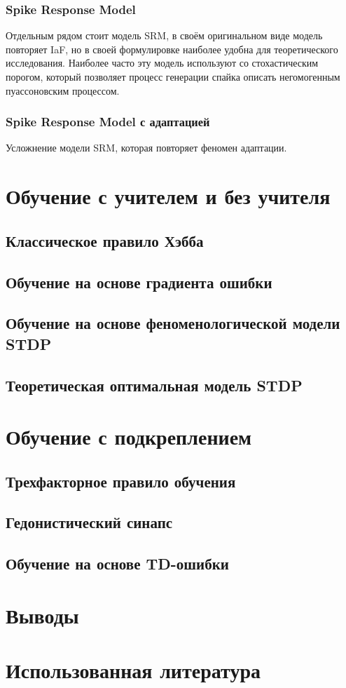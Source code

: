 \documentclass[a4paper,10pt]{article}
\begin{document}
\subsubsection{Spike Response Model}
Отдельным рядом стоит модель SRM, в своём оригинальном виде модель повторяет IaF, но в своей формулировке наиболее удобна для теоретического исследования. Наиболее часто эту модель используют со   стохастическим порогом, который позволяет процесс генерации спайка описать негомогенным пуассоновским процессом.

\subsubsection{Spike Response Model с адаптацией}
Усложнение модели SRM, которая повторяет феномен адаптации.

\section{Обучение с учителем и без учителя}
\subsection{Классическое правило Хэбба}
\subsection{Обучение на основе градиента ошибки}
\subsection{Обучение на основе феноменологической модели STDP}
\subsection{Теоретическая оптимальная модель STDP}
\section{Обучение с подкреплением}
\subsection{Трехфакторное правило обучения}
\subsection{Гедонистический синапс}
\subsection{Обучение на основе TD-ошибки}
\section{Выводы}
\section{Использованная литература}
{}

\end{document}
